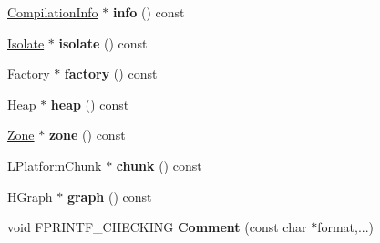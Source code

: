 \begin{DoxyCompactItemize}
\item 
\hypertarget{classv8_1_1internal_1_1_b_a_s_e___e_m_b_e_d_d_e_d_a833b0a16798da46ea7deff29fa4cc98b}{}\hyperlink{classv8_1_1internal_1_1_compilation_info}{Compilation\+Info} $\ast$ {\bfseries info} () const \label{classv8_1_1internal_1_1_b_a_s_e___e_m_b_e_d_d_e_d_a833b0a16798da46ea7deff29fa4cc98b}

\item 
\hypertarget{classv8_1_1internal_1_1_b_a_s_e___e_m_b_e_d_d_e_d_aafca7727b44748c75ff39a90282dfb8d}{}\hyperlink{classv8_1_1internal_1_1_isolate}{Isolate} $\ast$ {\bfseries isolate} () const \label{classv8_1_1internal_1_1_b_a_s_e___e_m_b_e_d_d_e_d_aafca7727b44748c75ff39a90282dfb8d}

\item 
\hypertarget{classv8_1_1internal_1_1_b_a_s_e___e_m_b_e_d_d_e_d_ac1997ab9dd7c081779a7e0999ef4713d}{}Factory $\ast$ {\bfseries factory} () const \label{classv8_1_1internal_1_1_b_a_s_e___e_m_b_e_d_d_e_d_ac1997ab9dd7c081779a7e0999ef4713d}

\item 
\hypertarget{classv8_1_1internal_1_1_b_a_s_e___e_m_b_e_d_d_e_d_acae6ee69fbbd8ecbc4327360b64f2ed1}{}Heap $\ast$ {\bfseries heap} () const \label{classv8_1_1internal_1_1_b_a_s_e___e_m_b_e_d_d_e_d_acae6ee69fbbd8ecbc4327360b64f2ed1}

\item 
\hypertarget{classv8_1_1internal_1_1_b_a_s_e___e_m_b_e_d_d_e_d_a406592e627cf3e71a3062ce90f9b75dc}{}\hyperlink{classv8_1_1internal_1_1_zone}{Zone} $\ast$ {\bfseries zone} () const \label{classv8_1_1internal_1_1_b_a_s_e___e_m_b_e_d_d_e_d_a406592e627cf3e71a3062ce90f9b75dc}

\item 
\hypertarget{classv8_1_1internal_1_1_b_a_s_e___e_m_b_e_d_d_e_d_a488d2db75f9c82308f9034b79b4f950a}{}L\+Platform\+Chunk $\ast$ {\bfseries chunk} () const \label{classv8_1_1internal_1_1_b_a_s_e___e_m_b_e_d_d_e_d_a488d2db75f9c82308f9034b79b4f950a}

\item 
\hypertarget{classv8_1_1internal_1_1_b_a_s_e___e_m_b_e_d_d_e_d_a586a8eaff2221ab14e3b55d7c67cb96f}{}H\+Graph $\ast$ {\bfseries graph} () const \label{classv8_1_1internal_1_1_b_a_s_e___e_m_b_e_d_d_e_d_a586a8eaff2221ab14e3b55d7c67cb96f}

\item 
\hypertarget{classv8_1_1internal_1_1_b_a_s_e___e_m_b_e_d_d_e_d_a71b22d3d58aee5b4b1aebfc7ac455dc1}{}void F\+P\+R\+I\+N\+T\+F\+\_\+\+C\+H\+E\+C\+K\+I\+N\+G {\bfseries Comment} (const char $\ast$format,...)\label{classv8_1_1internal_1_1_b_a_s_e___e_m_b_e_d_d_e_d_a71b22d3d58aee5b4b1aebfc7ac455dc1}


\end{DoxyCompactItemize}
